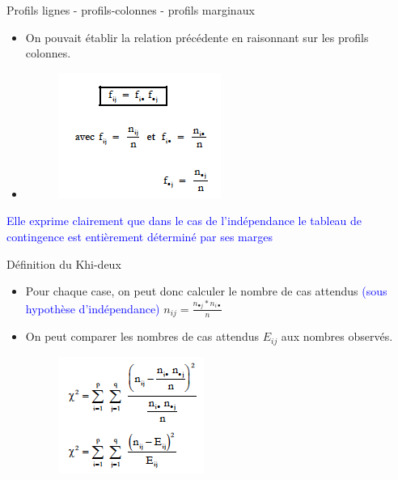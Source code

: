 \documentclass[11pt]{beamer}
\begin{document}
\begin{frame}{Profils lignes - profils-colonnes - profils
marginaux}

\begin{itemize}
\item  On pouvait établir la relation précédente en raisonnant sur les profils colonnes.
\item 

\begin{figure}
\includegraphics[scale=0.7]{Exemple5.png}  
\end{figure}
\end{itemize}

\textcolor{blue}{Elle exprime clairement que dans le cas de l’indépendance le tableau de contingence est entièrement déterminé par ses marges
}
\end{frame}

\begin{frame}{Définition du Khi-deux}
\begin{itemize}
\item Pour chaque case, on peut donc calculer le nombre de cas attendus \textcolor{blue}{(sous hypothèse d’indépendance)}
$n_{ij}=\frac{n_{\bullet j}*n_{i \bullet}}{n} $

\item On peut comparer les nombres de cas attendus $E_{ij}$ aux nombres observés.

\begin{figure}
\includegraphics[scale=0.8]{Exemple6.png}  
\end{figure}
\end{itemize}
\end{frame}
\end{document}
